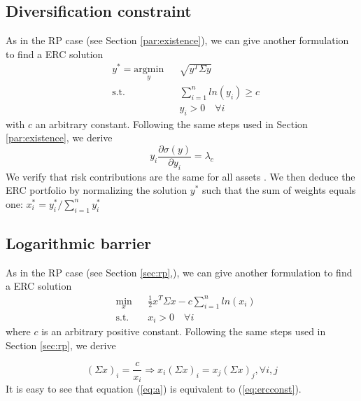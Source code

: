 \subsection{Diversification constraint}
As in the RP case (see Section \ref{par:existence}), we can give another formulation to find a ERC solution
\begin{equation}\label{eq:dc}
\begin{aligned}
& y^* = \underset{y}{\text{argmin}}
&& \sqrt{y^T \Sigma y}\\
& \text{s.t.}
&&\sum_{i=1}^n ln(y_i) \geq c\\
&&&y_i > 0 \hspace{1em} \forall i
\end{aligned}
\end{equation}
with $c$ an arbitrary constant. Following the same steps used in Section \ref{par:existence}, we derive 
\begin{equation}
y_i \frac{\partial\sigma(y)}{\partial y_i} = \lambda_c
\end{equation}
We verify that risk contributions are the same for all assets \cite{erc}. We then deduce the ERC portfolio by normalizing the solution $y^*$ such that the sum of weights equals one: $x_i^* =y_i^*/\sum_{i=1}^n y_i^*$

\subsection{Logarithmic barrier}
As in the RP case (see Section \ref{sec:rp},), we can give another formulation to find a ERC solution
\begin{equation}
\begin{aligned}
& \underset{x}{\text{min}}
&&\frac{1}{2} x^T \Sigma x - c \sum_{i=1}^{n} ln(x_i)\\
& \text{s.t.}
&& x_i > 0 \hspace{1em} \forall i
\end{aligned}
\end{equation}
where $c$ is an arbitrary positive constant. Following the same steps used in Section \ref{sec:rp}, we derive

\begin{equation}\label{eq:a}
(\Sigma x)_i = \frac{c}{x_i} \Rightarrow x_i(\Sigma x)_i = x_j(\Sigma x)_j, \forall i,j
\end{equation}
It is easy to see that equation (\ref{eq:a}) is equivalent to (\ref{eq:ercconst}). 

